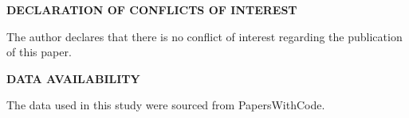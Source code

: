 \documentclass{article}
\begin{document}
\begin{center}
\Large\textbf{DECLARATION OF CONFLICTS OF INTEREST}
\end{center}

\vspace{1em} %

The author declares that there is no conflict of interest regarding the publication of this paper.

\newpage

\begin{center}
\Large\textbf{DATA AVAILABILITY}
\end{center}

\vspace{1em} %

The data used in this study were sourced from PapersWithCode.

\nocite{*}

\end{document}
